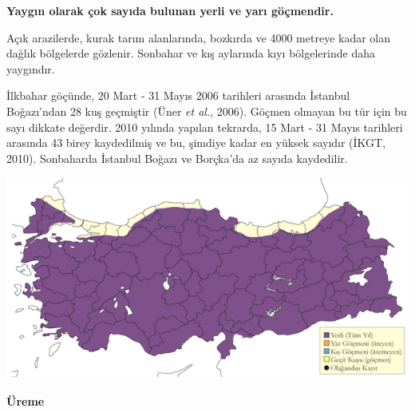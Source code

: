 \documentclass[
  a4paper,
  DIV=11,
  numbers=noendperiod]{scrreprt}
\begin{document}
\textbf{Yaygın olarak çok sayıda bulunan yerli ve yarı göçmendir.}

Açık arazilerde, kurak tarım alanlarında, bozkırda ve 4000 metreye kadar
olan dağlık bölgelerde gözlenir. Sonbahar ve kış aylarında kıyı
bölgelerinde daha yaygındır.

İlkbahar göçünde, 20 Mart - 31 Mayıs 2006 tarihleri arasında İstanbul
Boğazı'ndan 28 kuş geçmiştir (Üner \emph{et al.}, 2006). Göçmen olmayan
bu tür için bu sayı dikkate değerdir. 2010 yılında yapılan tekrarda, 15
Mart - 31 Mayıs tarihleri arasında 43 birey kaydedilmiş ve bu, şimdiye
kadar en yüksek sayıdır (İKGT, 2010). Sonbaharda İstanbul Boğazı ve
Borçka'da az sayıda kaydedilir.

\includegraphics{images/harita_Page_110.png}

\textbf{Üreme}
\end{document}
